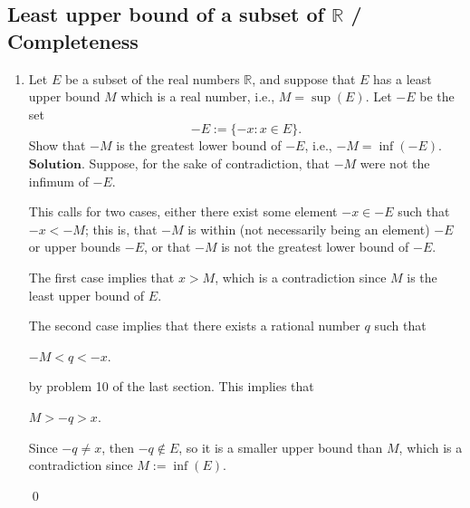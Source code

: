 \documentclass{article}
\theoremstyle{remark}
\begin{document}
    \subsection*{Least upper bound of a subset of $\mathbb{R}$ / Completeness}
        \begin{enumerate}
            \item Let \( E \) be a subset of the real numbers \( \mathbb{R} \), and suppose that \( E \) has a least upper bound \( M \) which is a real number, i.e., \( M = \sup(E) \). Let \( -E \) be the set 
            \[
            -E := \{-x : x \in E\}.
            \]
            Show that \( -M \) is the greatest lower bound of \( -E \), i.e., \( -M = \inf(-E) \).
            $\textbf{Solution.}$
            Suppose, for the sake of contradiction, that $-M$ were not the infimum of $-E$. 
            
            This calls for two cases,
            either there exist some element $-x \in -E$ such that $-x < -M$; this is, that $-M$ is within (not necessarily being an element) $-E$ or upper bounds $-E$, 
            or that $-M$ is not the greatest lower bound of $-E$.

            The first case implies that $x > M$, which is a contradiction since $M$ is the least upper bound of $E$.
            
            The second case implies that there exists a rational number $q$ such that 
            \begin{center}
                $-M < q < -x$.
            \end{center}
            by problem 10 of the last section. This implies that
            \begin{center}
                $M > -q > x$.
            \end{center}
            Since $-q \neq x$, then $-q \notin E$, so it is a smaller upper bound than $M$, which is a contradiction since $M := \inf(E)$. 
            \begin{flushright}
                \qed
            \end{flushright}


\end{enumerate}
\end{document}
